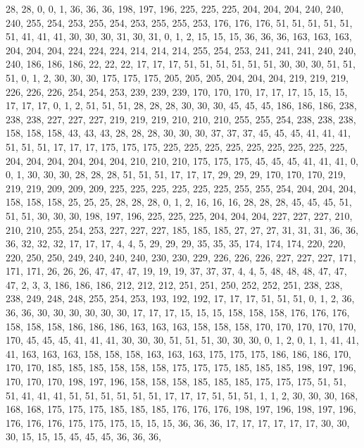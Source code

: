 28, 28, 0, 0, 1, 36, 36, 36, 198, 197, 196, 225, 225, 225, 204, 204, 204, 240, 240, 240, 255, 254, 253, 255, 254, 253, 255, 255, 253, 176, 176, 176,
51, 51, 51, 51, 51, 51, 41, 41, 41, 30, 30, 30, 31, 30, 31, 0, 1, 2, 15, 15, 15, 36, 36, 36, 163, 163, 163, 204, 204, 204, 224, 224,
224, 214, 214, 214, 255, 254, 253, 241, 241, 241, 240, 240, 240, 186, 186, 186, 22, 22, 22, 17, 17, 17, 51, 51, 51, 51, 51, 51, 30, 30, 30, 51,
51, 51, 0, 1, 2, 30, 30, 30, 175, 175, 175, 205, 205, 205, 204, 204, 204, 219, 219, 219, 226, 226, 226, 254, 254, 253, 239, 239, 239, 170, 170, 170,
17, 17, 17, 15, 15, 15, 17, 17, 17, 0, 1, 2, 51, 51, 51, 28, 28, 28, 30, 30, 30, 45, 45, 45, 186, 186, 186, 238, 238, 238, 227, 227,
227, 219, 219, 219, 210, 210, 210, 255, 255, 254, 238, 238, 238, 158, 158, 158, 43, 43, 43, 28, 28, 28, 30, 30, 30, 37, 37, 37, 45, 45, 45, 41,
41, 41, 51, 51, 51, 17, 17, 17, 175, 175, 175, 225, 225, 225, 225, 225, 225, 225, 225, 225, 204, 204, 204, 204, 204, 204, 210, 210, 210, 175, 175, 175,
45, 45, 45, 41, 41, 41, 0, 0, 1, 30, 30, 30, 28, 28, 28, 51, 51, 51, 17, 17, 17, 29, 29, 29, 170, 170, 170, 219, 219, 219, 209, 209,
209, 225, 225, 225, 225, 225, 225, 255, 255, 254, 204, 204, 204, 158, 158, 158, 25, 25, 25, 28, 28, 28, 0, 1, 2, 16, 16, 16, 28, 28, 28, 45,
45, 45, 51, 51, 51, 30, 30, 30, 198, 197, 196, 225, 225, 225, 204, 204, 204, 227, 227, 227, 210, 210, 210, 255, 254, 253, 227, 227, 227, 185, 185, 185,
27, 27, 27, 31, 31, 31, 36, 36, 36, 32, 32, 32, 17, 17, 17, 4, 4, 5, 29, 29, 29, 35, 35, 35, 174, 174, 174, 220, 220, 220, 250, 250,
249, 240, 240, 240, 230, 230, 229, 226, 226, 226, 227, 227, 227, 171, 171, 171, 26, 26, 26, 47, 47, 47, 19, 19, 19, 37, 37, 37, 4, 4, 5, 48,
48, 48, 47, 47, 47, 2, 3, 3, 186, 186, 186, 212, 212, 212, 251, 251, 250, 252, 252, 251, 238, 238, 238, 249, 248, 248, 255, 254, 253, 193, 192, 192,
17, 17, 17, 51, 51, 51, 0, 1, 2, 36, 36, 36, 30, 30, 30, 30, 30, 30, 17, 17, 17, 15, 15, 15, 158, 158, 158, 176, 176, 176, 158, 158,
158, 186, 186, 186, 163, 163, 163, 158, 158, 158, 170, 170, 170, 170, 170, 170, 45, 45, 45, 41, 41, 41, 30, 30, 30, 51, 51, 51, 30, 30, 30, 0,
1, 2, 0, 1, 1, 41, 41, 41, 163, 163, 163, 158, 158, 158, 163, 163, 163, 175, 175, 175, 186, 186, 186, 170, 170, 170, 185, 185, 185, 158, 158, 158,
175, 175, 175, 185, 185, 185, 198, 197, 196, 170, 170, 170, 198, 197, 196, 158, 158, 158, 185, 185, 185, 175, 175, 175, 51, 51, 51, 41, 41, 41, 51, 51,
51, 51, 51, 51, 17, 17, 17, 51, 51, 51, 1, 1, 2, 30, 30, 30, 168, 168, 168, 175, 175, 175, 185, 185, 185, 176, 176, 176, 198, 197, 196, 198,
197, 196, 176, 176, 176, 175, 175, 175, 15, 15, 15, 36, 36, 36, 17, 17, 17, 17, 17, 17, 30, 30, 30, 15, 15, 15, 45, 45, 45, 36, 36, 36,
